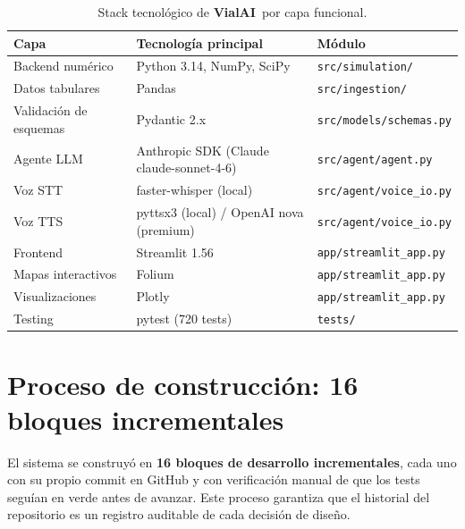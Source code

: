 \documentclass[11pt,a4paper]{article}
\newcommand{\VialAI}{\textbf{\textcolor{vialTeal}{Vial}\textcolor{vialAmber}{AI}}}
\begin{document}
\begin{table}[H]
\centering
\small
\renewcommand{\arraystretch}{1.4}
\begin{tabularx}{\linewidth}{@{}l l X@{}}
\toprule
\rowcolor{vialNavy!10}
\textbf{Capa} & \textbf{Tecnología principal} & \textbf{Módulo} \\
\midrule
Backend numérico & Python 3.14, NumPy, SciPy & \texttt{src/simulation/} \\
Datos tabulares & Pandas & \texttt{src/ingestion/} \\
Validación de esquemas & Pydantic 2.x & \texttt{src/models/schemas.py} \\
Agente LLM & Anthropic SDK (Claude claude-sonnet-4-6) & \texttt{src/agent/agent.py} \\
Voz STT & faster-whisper (local) & \texttt{src/agent/voice\_io.py} \\
Voz TTS & pyttsx3 (local) / OpenAI nova (premium) & \texttt{src/agent/voice\_io.py} \\
Frontend & Streamlit 1.56 & \texttt{app/streamlit\_app.py} \\
Mapas interactivos & Folium & \texttt{app/streamlit\_app.py} \\
Visualizaciones & Plotly & \texttt{app/streamlit\_app.py} \\
Testing & pytest (\num{720} tests) & \texttt{tests/} \\
\bottomrule
\end{tabularx}
\caption{Stack tecnológico de \VialAI\ por capa funcional.}
\label{tab:stack}
\end{table}

\section{Proceso de construcción: 16 bloques incrementales}

El sistema se construyó en \textbf{16 bloques de desarrollo
incrementales}, cada uno con su propio commit en GitHub y con
verificación manual de que los tests seguían en verde antes de
avanzar. Este proceso garantiza que el historial del repositorio
es un registro auditable de cada decisión de diseño.
\end{document}
